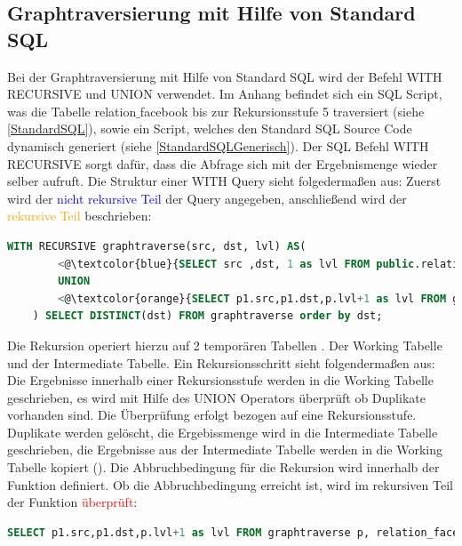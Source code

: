 \subsection{Graphtraversierung mit Hilfe von Standard \ac{SQL}}
Bei der Graphtraversierung mit Hilfe von Standard \ac{SQL} wird der Befehl WITH RECURSIVE und UNION verwendet. Im Anhang befindet sich ein SQL
Script, was die Tabelle relation$\_$facebook bis zur Rekursionsstufe 5 traversiert (siehe \ref{StandardSQL}), sowie ein Script, welches den Standard SQL Source Code
dynamisch generiert (siehe \ref{StandardSQLGenerisch}).
Der SQL Befehl WITH RECURSIVE sorgt dafür, dass die Abfrage sich mit der Ergebnismenge wieder selber aufruft. Die Struktur einer WITH Query sieht folgedermaßen aus:
Zuerst wird der \textcolor{blue}{nicht rekursive Teil} der Query angegeben, anschließend wird der \textcolor{orange}{rekursive Teil} beschrieben:
\begin{lstlisting}[language=SQL,caption = Rekursiver und nicht rekursiver Teil,frame=single, label={StrukturderQuery} ]
    WITH RECURSIVE graphtraverse(src, dst, lvl) AS(
        <@\textcolor{blue}{SELECT src ,dst, 1 as lvl FROM public.relation$\_$facebook WHERE src =765} @>
        UNION
        <@\textcolor{orange}{SELECT p1.src,p1.dst,p.lvl+1 as lvl FROM graphtraverse p, relation$\_$facebook p1 WHERE p1.src IN ( p.dst ) and lvl<5} @>
    ) SELECT DISTINCT(dst) FROM graphtraverse order by dst;
\end{lstlisting}
Die Rekursion operiert hierzu auf 2 temporären Tabellen
. Der Working Tabelle und der Intermediate Tabelle. Ein Rekursionsschritt sieht folgendermaßen aus: Die Ergebnisse innerhalb einer Rekursionsstufe werden in die
Working Tabelle geschrieben, es wird mit Hilfe des UNION Operators überprüft ob Duplikate vorhanden sind. Die Überprüfung erfolgt bezogen auf eine Rekursionsstufe.
Duplikate werden gelöscht, die Ergebissmenge wird in die Intermediate Tabelle geschrieben, die Ergebnisse aus der Intermediate Tabelle werden in die Working Tabelle
kopiert (\cite{postgreswithrecursive}). Die Abbruchbedingung für die Rekursion wird innerhalb der Funktion definiert. Ob die Abbruchbedingung erreicht ist, wird im rekursiven Teil der Funktion \textcolor{red}{überprüft}:
\begin{lstlisting}[language=SQL,caption = Überprüfen der Abbruchbedingung,frame=single, label={Abbruchbedingung} ]
    SELECT p1.src,p1.dst,p.lvl+1 as lvl FROM graphtraverse p, relation_facebook p1 WHERE p1.src IN ( p.dst ) and <@\textcolor{red}{lvl<5} @>
\end{lstlisting}

